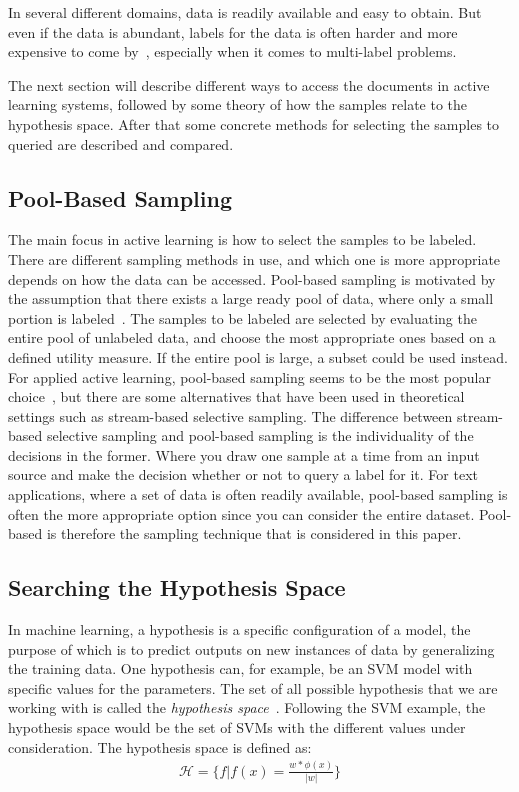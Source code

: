 In several different domains, data is readily available and easy to obtain.
But even if the data is abundant, labels for the data is often harder and more expensive to come by~\cite{settles2012active}, especially when it comes to multi-label problems.

The next section will describe different ways to access the documents in active learning systems, followed by some theory of how the samples relate to the hypothesis space.
After that some concrete methods for selecting the samples to queried are described and compared.

\subsection{Pool-Based Sampling}

The main focus in active learning is how to select the samples to be labeled.
There are different sampling methods in use, and which one is more appropriate depends on how the data can be accessed.
Pool-based sampling is motivated by the assumption that there exists a large ready pool of data, where only a small portion is labeled~\cite{lewis1994sequential, settles2012active}.
The samples to be labeled are selected by evaluating the entire pool of unlabeled data, and choose the most appropriate ones based on a defined utility measure.
If the entire pool is large, a subset could be used instead.
For applied active learning, pool-based sampling seems to be the most popular choice~\cite{li2013active}, but there are some alternatives that have been used in theoretical settings such as stream-based selective sampling.
The difference between stream-based selective sampling and pool-based sampling is the individuality of the decisions in the former.
Where you draw one sample at a time from an input source and make the decision whether or not to query a label for it.
For text applications, where a set of data is often readily available, pool-based sampling is often the more appropriate option since you can consider the entire dataset.
Pool-based is therefore the sampling technique that is considered in this paper.

\subsection{Searching the Hypothesis Space}

In machine learning, a hypothesis is a specific configuration of a model, the purpose of which is to predict outputs on new instances of data by generalizing the training data.
One hypothesis can, for example, be an SVM model with specific values for the parameters.
The set of all possible hypothesis that we are working with is called the \textit{hypothesis space}~\cite{russell2016artificial}.
Following the SVM example, the hypothesis space would be the set of SVMs with the different values under consideration.
The hypothesis space is defined as:
\begin{equation}
    \begin{aligned}
        \mathcal{H} = \Bigg \{ f | f(x) = \frac{w * \phi(x)}{|w|} \Bigg \}\\
    \end{aligned}
\end{equation}

